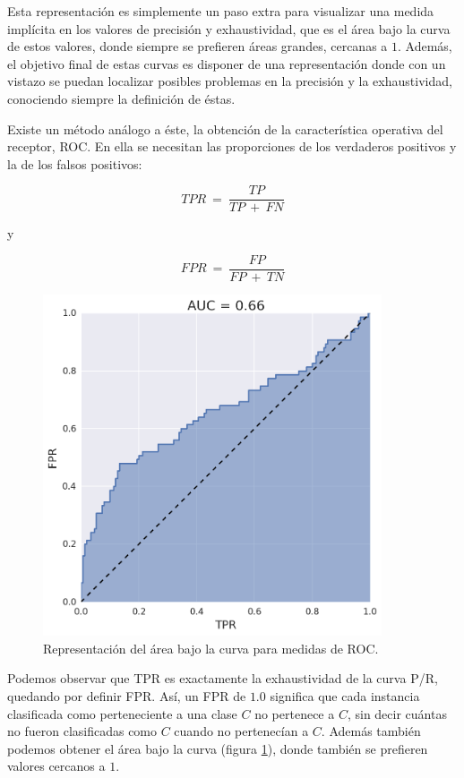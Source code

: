 Esta representación es simplemente un paso extra para visualizar una medida implícita en los valores de precisión y exhaustividad, que es el área bajo la curva de estos valores, donde siempre se prefieren áreas grandes, cercanas a $1$. Además, el objetivo final de estas curvas es disponer de una representación donde con un vistazo se puedan localizar posibles problemas en la precisión y la exhaustividad, conociendo siempre la definición de éstas.

Existe un método análogo a éste, la obtención de la característica operativa del receptor, ROC. En ella se necesitan las proporciones de los verdaderos positivos y la de los falsos positivos:

$$
TPR\:=\:\frac{TP}{TP\:+\:FN}
$$

\noindent
y

$$
FPR\:=\:\frac{FP}{FP\:+\:TN}
$$

\begin{figure}[ht]
  \centering
  \includegraphics[width=100mm]{figures/ch_03/roc_example.png}
  \caption{Representación del área bajo la curva para medidas de ROC.}
  \label{fig:3.10}
\end{figure}

Podemos observar que TPR es exactamente la exhaustividad de la curva P/R, quedando por definir FPR. Así, un FPR de $1.0$ significa que cada instancia clasificada como perteneciente a una clase $C$ no pertenece a $C$, sin decir cuántas no fueron clasificadas como $C$ cuando no pertenecían a $C$. Además también podemos obtener el área bajo la curva (figura \ref{fig:3.10}), donde también se prefieren valores cercanos a $1$.

